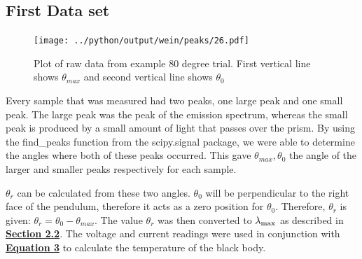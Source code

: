 \documentclass[
	letterpaper
	12pt
]{template}
\newcommand{\bref}[2]{\textbf{\hyperref[#1]{#2}}}
\begin{document}
\subsection{First Data set}
\begin{figure}\label{fig::peaks}
	\vspace{-27pt}
	\texttt{[image: ../python/output/wein/peaks/26.pdf]}
	\caption{Plot of raw data from example 80 degree trial. First vertical line shows $\theta_{max}$ and second vertical line shows $\theta_0$}
	\vspace{-20pt}
\end{figure}
Every sample that was measured had two peaks, one large peak and one small peak. The large peak was the peak of the emission spectrum, whereas the small peak is produced by a small amount of light that passes over the prism. By using the find\_peaks function from the scipy.signal package, we were able to determine the angles where both of these peaks occurred. This gave $\theta_{max},\theta_{0}$ the angle of the larger and smaller peaks respectively for each sample.\vspace{\baselineskip}

$\theta_r$ can be calculated from these two angles. $\theta_0$ will be perpendicular to the right face of the pendulum, therefore it acts as a zero position for $\theta_0$. Therefore, $\theta_r$ is given: $\theta_r =\theta_{0} - \theta_{max}$. The value $\theta_r$ was then converted to $\lambda_{\rm max}$ as described in \bref{sec::refraction}{Section 2.2}. The voltage and current readings were used in conjunction with \bref{eqn::temp}{Equation 3} to calculate the temperature of the black body.\vspace{\baselineskip}
\end{document}
